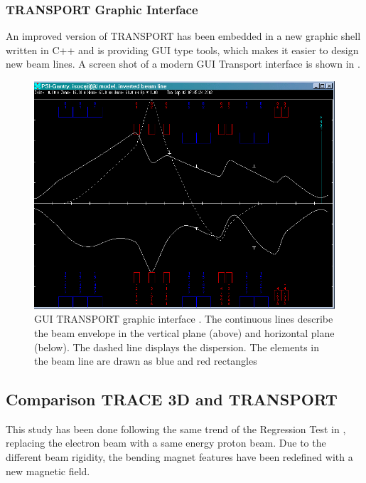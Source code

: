\subsubsection{TRANSPORT Graphic Interface}
\label{ssec:TRAN_graphic}
An improved version of TRANSPORT has been embedded in a new graphic shell written in C++ and is providing GUI type tools, which makes it easier to design new beam lines. A screen shot of a modern GUI Transport interface \cite{Transport_GUI} is shown in .
\begin{figure}[htbp]
 \centering
     \includegraphics[width=\textwidth-1cm, keepaspectratio=true]{figures/Benchmarks/TRANSPORT.png}
    \caption{GUI TRANSPORT graphic interface \cite{Tran_ex}. The continuous lines describe the beam envelope in the vertical plane (above) and horizontal plane (below). The dashed line displays the dispersion. The elements in the beam line are drawn as blue and red rectangles}
 \label{fig:TRANSPORT}
\end{figure}

\subsection{Comparison TRACE 3D and TRANSPORT}
\label{sec:T3D_TRAN}
This study has been done following the same trend of the Regression Test in \opal \cite{AMAS}, replacing the electron beam with a same energy proton beam. Due to the different beam rigidity, the bending magnet features have been redefined with a new magnetic field.

